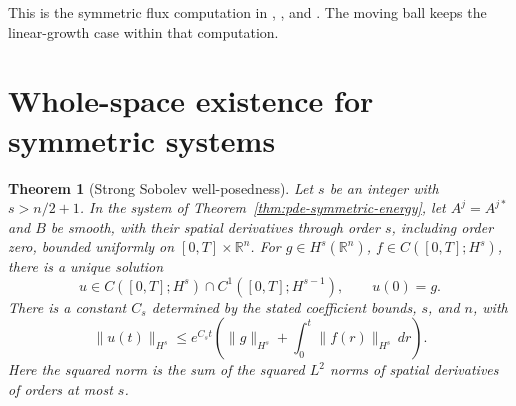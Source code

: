 \documentclass[11pt,oneside,openany]{book}
\theoremstyle{plain}
\newtheorem{theorem}{Theorem}[chapter]
\theoremstyle{definition}
\theoremstyle{remark}
\begin{document}
This is the symmetric flux computation in
\cite[Section 7.3.2]{Evans},
\cite[Chapter 5, Section 3]{John}, and
\cite[Chapter 6, Section 5]{TaylorI}. The moving ball keeps the
linear-growth case within that computation.

\section{Whole-space existence for symmetric systems}\label{pde:W07}

\begin{theorem}[Strong Sobolev well-posedness]\label{thm:pde-symmetric-hs}
Let \(s\) be an integer with \(s>n/2+1\).
In the system of Theorem~\ref{thm:pde-symmetric-energy}, let
\(A^j=A^{j*}\) and \(B\) be smooth, with their spatial derivatives
through order \(s\), including order zero, bounded uniformly on
\([0,T]\times\mathbb R^n\).
For \(g\in H^s(\mathbb R^n)\), \(f\in C([0,T];H^s)\), there is
a unique solution
\[
 u\in C([0,T];H^s)\cap C^1([0,T];H^{s-1}),\qquad u(0)=g .
\]
There is a constant \(C_s\) determined by the stated coefficient
bounds, \(s\), and \(n\), with
\[
 \|u(t)\|_{H^s}
 \leq e^{C_s t}\left(\|g\|_{H^s}
                         +\int_0^t\|f(r)\|_{H^s}\,dr\right).
\]
Here the squared norm is the sum of the squared \(L^2\) norms
of spatial derivatives of orders at most \(s\).
\end{theorem}
\end{document}
